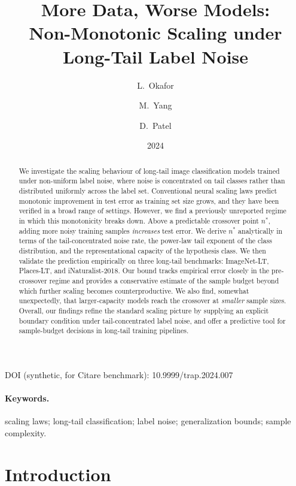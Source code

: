 \documentclass[11pt]{article}
\title{More Data, Worse Models:\\
Non-Monotonic Scaling under Long-Tail Label Noise}
\author{L.\ Okafor \and M.\ Yang \and D.\ Patel}
\date{2024}
\begin{document}
\maketitle
\noindent DOI (synthetic, for Citare benchmark): 10.9999/trap.2024.007

\begin{abstract}
We investigate the scaling behaviour of long-tail image classification models trained under non-uniform label noise, where noise is concentrated on tail classes rather than distributed uniformly across the label set. Conventional neural scaling laws predict monotonic improvement in test error as training set size grows, and they have been verified in a broad range of settings. However, we find a previously unreported regime in which this monotonicity breaks down. Above a predictable crossover point $n^{*}$, adding more noisy training samples \emph{increases} test error. We derive $n^{*}$ analytically in terms of the tail-concentrated noise rate, the power-law tail exponent of the class distribution, and the representational capacity of the hypothesis class. We then validate the prediction empirically on three long-tail benchmarks: ImageNet-LT, Places-LT, and iNaturalist-2018. Our bound tracks empirical error closely in the pre-crossover regime and provides a conservative estimate of the sample budget beyond which further scaling becomes counterproductive. We also find, somewhat unexpectedly, that larger-capacity models reach the crossover at \emph{smaller} sample sizes. Overall, our findings refine the standard scaling picture by supplying an explicit boundary condition under tail-concentrated label noise, and offer a predictive tool for sample-budget decisions in long-tail training pipelines.
\end{abstract}

\paragraph{Keywords.} scaling laws; long-tail classification; label noise; generalization bounds; sample complexity.

\section{Introduction}
\end{document}
